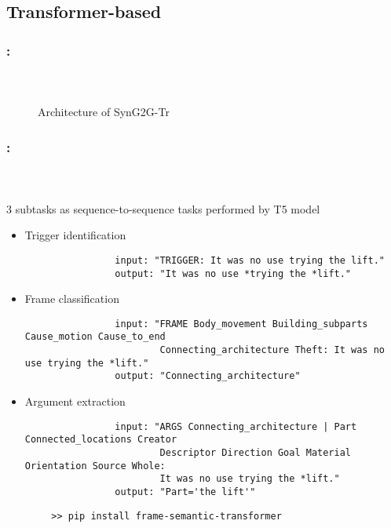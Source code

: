 \documentclass[xcolor=table]{beamer}
\begin{document}
\subsection{Transformer-based}

\begin{frame}
	\frametitle{\insertshortsubtitle: \insertsection}
	\framesubtitle{\insertsubsection\ \cite{2023-mohammadshahi-henderson}}
	\begin{figure}
		\centering
		\caption{Architecture of SynG2G-Tr \cite{2023-mohammadshahi-henderson}}
	\end{figure}
	
\end{frame}

\begin{frame}[fragile]
	\frametitle{\insertshortsubtitle: \insertsection}
	\framesubtitle{\insertsubsection\ \cite{2023-chanin}}
	
	3 subtasks as sequence-to-sequence tasks performed by T5 model
	\begin{itemize}
		\item Trigger identification
		{\scriptsize\bfseries\color{olivegreen} 
		\begin{verbatim}
				input: "TRIGGER: It was no use trying the lift."
				output: "It was no use *trying the *lift."
		\end{verbatim}
		}
		\item Frame classification
		{\scriptsize\bfseries\color{olivegreen} 
		\begin{verbatim}
				input: "FRAME Body_movement Building_subparts Cause_motion Cause_to_end 
				        Connecting_architecture Theft: It was no use trying the *lift."
				output: "Connecting_architecture"
		\end{verbatim}
		}
		\item Argument extraction
		{\scriptsize\bfseries\color{olivegreen} 
		\begin{verbatim}
				input: "ARGS Connecting_architecture | Part Connected_locations Creator 
				        Descriptor Direction Goal Material Orientation Source Whole: 
				        It was no use trying the *lift."
				output: "Part='the lift'"
		\end{verbatim}
		}
	\end{itemize}
	
	\begin{verbatim}
		>> pip install frame-semantic-transformer
	\end{verbatim}
	
\end{frame}
\end{document}
